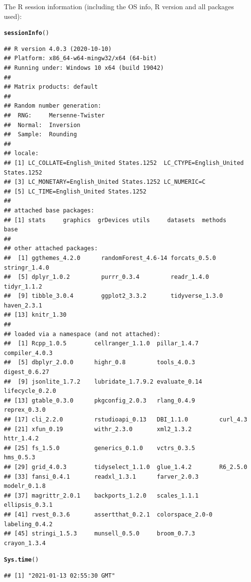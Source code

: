 \documentclass{article}\usepackage[]{graphicx}\usepackage[]{color}
\makeatletter
\newcommand{\hlstd}[1]{\textcolor[rgb]{0.345,0.345,0.345}{#1}}%
\newcommand{\hlkwd}[1]{\textcolor[rgb]{0.737,0.353,0.396}{\textbf{#1}}}%
\newenvironment{kframe}{%
 \def\at@end@of@kframe{}%
 \ifinner\ifhmode%
  \def\at@end@of@kframe{\end{minipage}}%
  \begin{minipage}{\columnwidth}%
 \fi\fi%
 \def\FrameCommand##1{\hskip\@totalleftmargin \hskip-\fboxsep
 \colorbox{shadecolor}{##1}\hskip-\fboxsep
     \hskip-\linewidth \hskip-\@totalleftmargin \hskip\columnwidth}%
 \MakeFramed {\advance\hsize-\width
   \@totalleftmargin\z@ \linewidth\hsize
   \@setminipage}}%
 {\par\unskip\endMakeFramed%
 \at@end@of@kframe}
\newenvironment{knitrout}{}{} %
\makeatother
\begin{document}
The R session information (including the OS info, R version and all
packages used):

\begin{knitrout}
\color{fgcolor}\begin{kframe}
\begin{alltt}
\hlkwd{sessionInfo}\hlstd{()}
\end{alltt}
\begin{verbatim}
## R version 4.0.3 (2020-10-10)
## Platform: x86_64-w64-mingw32/x64 (64-bit)
## Running under: Windows 10 x64 (build 19042)
## 
## Matrix products: default
## 
## Random number generation:
##  RNG:     Mersenne-Twister 
##  Normal:  Inversion 
##  Sample:  Rounding 
##  
## locale:
## [1] LC_COLLATE=English_United States.1252  LC_CTYPE=English_United States.1252   
## [3] LC_MONETARY=English_United States.1252 LC_NUMERIC=C                          
## [5] LC_TIME=English_United States.1252    
## 
## attached base packages:
## [1] stats     graphics  grDevices utils     datasets  methods   base     
## 
## other attached packages:
##  [1] ggthemes_4.2.0      randomForest_4.6-14 forcats_0.5.0       stringr_1.4.0      
##  [5] dplyr_1.0.2         purrr_0.3.4         readr_1.4.0         tidyr_1.1.2        
##  [9] tibble_3.0.4        ggplot2_3.3.2       tidyverse_1.3.0     haven_2.3.1        
## [13] knitr_1.30         
## 
## loaded via a namespace (and not attached):
##  [1] Rcpp_1.0.5        cellranger_1.1.0  pillar_1.4.7      compiler_4.0.3   
##  [5] dbplyr_2.0.0      highr_0.8         tools_4.0.3       digest_0.6.27    
##  [9] jsonlite_1.7.2    lubridate_1.7.9.2 evaluate_0.14     lifecycle_0.2.0  
## [13] gtable_0.3.0      pkgconfig_2.0.3   rlang_0.4.9       reprex_0.3.0     
## [17] cli_2.2.0         rstudioapi_0.13   DBI_1.1.0         curl_4.3         
## [21] xfun_0.19         withr_2.3.0       xml2_1.3.2        httr_1.4.2       
## [25] fs_1.5.0          generics_0.1.0    vctrs_0.3.5       hms_0.5.3        
## [29] grid_4.0.3        tidyselect_1.1.0  glue_1.4.2        R6_2.5.0         
## [33] fansi_0.4.1       readxl_1.3.1      farver_2.0.3      modelr_0.1.8     
## [37] magrittr_2.0.1    backports_1.2.0   scales_1.1.1      ellipsis_0.3.1   
## [41] rvest_0.3.6       assertthat_0.2.1  colorspace_2.0-0  labeling_0.4.2   
## [45] stringi_1.5.3     munsell_0.5.0     broom_0.7.3       crayon_1.3.4
\end{verbatim}
\begin{alltt}
\hlkwd{Sys.time}\hlstd{()}
\end{alltt}
\begin{verbatim}
## [1] "2021-01-13 02:55:30 GMT"
\end{verbatim}
\end{kframe}
\end{knitrout}
\end{document}
